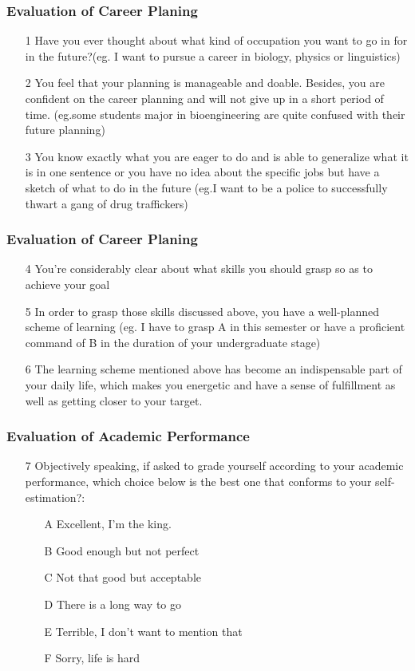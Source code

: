 \begin{frame}
    \frametitle{Evaluation of Career Planing}
    \begin{enumerate}
        \item [1] Have you ever thought about what kind of occupation you want to go in for in the future?(eg. I want to pursue a career in biology, physics or linguistics)
        \item [2] You feel that your planning is manageable and doable. Besides, you are confident on the career planning and will not give up in a short period of time. (eg.some students major in bioengineering are quite confused with their future planning)
        \item [3]You know exactly what you are eager to do and is able to generalize what it is in one sentence or you have no idea about the specific jobs but have a sketch of what to do in the future (eg.I want to be a police to successfully thwart a gang of drug traffickers)
    \end{enumerate}
\end{frame}

\begin{frame}
    \frametitle{Evaluation of Career Planing}
    \begin{enumerate}
        \item [4] You’re considerably clear about what skills you should grasp so as to achieve your goal
        \item [5] In order to grasp those skills discussed above, you have a well-planned scheme of learning (eg. I have to grasp A in this semester or have a proficient command of B in the duration of your undergraduate stage)
        \item [6] The learning scheme mentioned above has become an indispensable part of your daily life, which makes you energetic and have a sense of fulfillment as well as getting closer to your target.
    \end{enumerate}
\end{frame}

\begin{frame}
    \frametitle{Evaluation of Academic Performance}
    \begin{enumerate}
        \item [7] Objectively speaking, if asked to grade yourself according to your academic performance, which choice below is the best one that conforms to your self-estimation?:
        \begin{itemize}
            \item [A] Excellent, I’m the king.
            \item [B] Good enough but not perfect
            \item [C] Not that good but acceptable
            \item [D] There is a long way to go
            \item [E] Terrible, I don’t want to mention that
            \item [F] Sorry, life is hard 
        \end{itemize}
    \end{enumerate}
\end{frame}